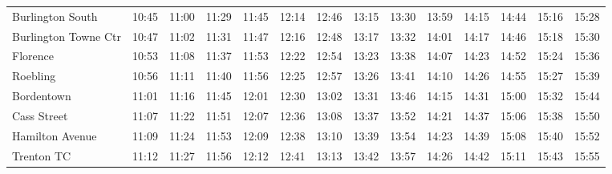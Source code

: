 \begin{center}
\begin{tabular}{@{}lrrrrrrrrrrrrr@{}}
Burlington South & 10:45 & 11:00 & 11:29 & 11:45 & 12:14 & 12:46 & 13:15 & 13:30 & 13:59 & 14:15 & 14:44 & 15:16 & 15:28 \\
Burlington Towne Ctr & 10:47 & 11:02 & 11:31 & 11:47 & 12:16 & 12:48 & 13:17 & 13:32 & 14:01 & 14:17 & 14:46 & 15:18 & 15:30 \\
Florence & 10:53 & 11:08 & 11:37 & 11:53 & 12:22 & 12:54 & 13:23 & 13:38 & 14:07 & 14:23 & 14:52 & 15:24 & 15:36 \\
Roebling & 10:56 & 11:11 & 11:40 & 11:56 & 12:25 & 12:57 & 13:26 & 13:41 & 14:10 & 14:26 & 14:55 & 15:27 & 15:39 \\
Bordentown & 11:01 & 11:16 & 11:45 & 12:01 & 12:30 & 13:02 & 13:31 & 13:46 & 14:15 & 14:31 & 15:00 & 15:32 & 15:44 \\
Cass Street & 11:07 & 11:22 & 11:51 & 12:07 & 12:36 & 13:08 & 13:37 & 13:52 & 14:21 & 14:37 & 15:06 & 15:38 & 15:50 \\
Hamilton Avenue & 11:09 & 11:24 & 11:53 & 12:09 & 12:38 & 13:10 & 13:39 & 13:54 & 14:23 & 14:39 & 15:08 & 15:40 & 15:52 \\
Trenton TC & 11:12 & 11:27 & 11:56 & 12:12 & 12:41 & 13:13 & 13:42 & 13:57 & 14:26 & 14:42 & 15:11 & 15:43 & 15:55 \\
\bottomrule\end{tabular}\end{center}
